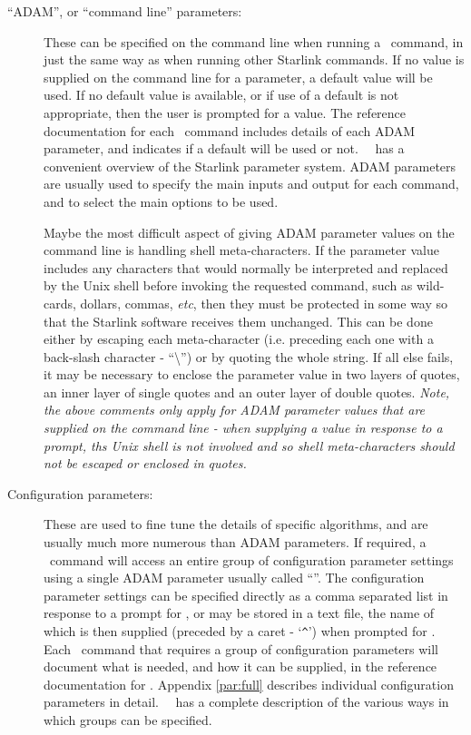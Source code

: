 \documentclass[oneside,11pt]{starlink}
\begin{document}
\begin{description}
\item[``ADAM'', or ``command line''  parameters:] These can be specified on
the command line when running a \SMURF\ command, in just the same way as when
running other Starlink commands. If no value is supplied on the command
line for a parameter, a default value will be used. If no default value
is available, or if use of a default is not appropriate, then the user is
prompted for a value. The reference documentation for each \SMURF\ command
includes details of each ADAM parameter, and indicates if a default will
be used or not. \KAPPA\ \ has a
convenient overview of the Starlink parameter system. ADAM parameters are
usually used to specify the main inputs and output for each command, and
to select the main options to be used.

Maybe the most difficult aspect of giving ADAM parameter values on the
command line is handling shell meta-characters. If the parameter
value includes any characters that would normally be interpreted and
replaced by the Unix shell before invoking the requested command, such as
wild-cards, dollars, commas, \emph{etc}, then they must be protected in
some way so that the Starlink software receives them unchanged. This can
be done either by escaping each meta-character (i.e. preceding each one
with a back-slash character - ``\textbackslash'') or by quoting the whole
string. If all else fails, it may be necessary to enclose the parameter
value in two layers of quotes, an inner layer of single quotes and an
outer layer of double quotes. \emph{Note, the above comments only apply for ADAM
parameter values that are supplied on the command line - when supplying a
value in response to a prompt, ths Unix shell is not involved and so shell
meta-characters should not be escaped or enclosed in quotes.}

\item[Configuration parameters:] These are used to fine tune the details
of specific algorithms, and are usually much more numerous than ADAM
parameters. If required, a \SMURF\ command will access an entire group of
configuration parameter settings using a single ADAM parameter usually called
``''. The configuration parameter settings can be specified
directly as a comma separated list in response to a prompt for
, or may be stored in a text file, the name of which is then
supplied (preceded by a caret - `\verb+^+') when prompted for
. Each \SMURF\ command that requires a group of configuration
parameters will document what is needed, and how it can be supplied, in the
reference documentation for . Appendix \ref{par:full} describes
individual configuration parameters in detail. \KAPPA\ \
has a complete description of the various ways in which groups can be specified.
\end{description}
\end{document}

